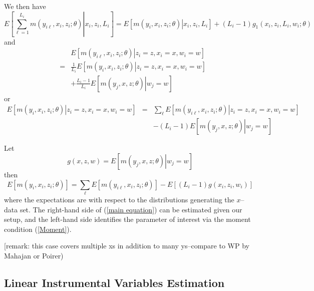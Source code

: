 \documentclass[12pt]{article}
\begin{document}
We then have%
\begin{equation*}
E\left[ \left. \sum_{\ell =1}^{L_{i}}m\left( y_{i\ell },x_{i},z_{i};\theta
\right) \right\vert x_{i},z_{i},L_{i}\right] =E\left[ \left. m\left(
y_{i},x_{i},z_{i};\theta \right) \right\vert x_{i},z_{i},L_{i}\right]
+\left( L_{i}-1\right) g_{1}\left( x_{i},z_{i},L_{i},w_{i};\theta \right)
\end{equation*}%
and%
\begin{eqnarray*}
&&E\left[ \left. m\left( y_{i\ell },x_{i},z_{i};\theta \right) \right\vert
z_{i}=z,x_{i}=x,w_{i}=w\right]  \\
&=&\frac{1}{L_{i}}E\left[ \left. m\left( y_{i},x_{i},z_{i};\theta \right)
\right\vert z_{i}=z,x_{i}=x,w_{i}=w\right]  \\
&&+\frac{L_{i}-1}{L_{i}}E\left[ \left. m\left( y_{j},x,z;\theta \right)
\right\vert w_{j}=w\right]
\end{eqnarray*}%
or%
\begin{eqnarray*}
E\left[ \left. m\left( y_{i},x_{i},z_{i};\theta \right) \right\vert
z_{i}=z,x_{i}=x,w_{i}=w\right]  &=&\sum_{\ell }E\left[ \left. m\left(
y_{i\ell },x_{i},z_{i};\theta \right) \right\vert z_{i}=z,x_{i}=x,w_{i}=w%
\right]  \\
&&-\left( L_{i}-1\right) E\left[ \left. m\left( y_{j},x,z;\theta \right)
\right\vert w_{j}=w\right]
\end{eqnarray*}

Let
\begin{equation*}
g\left( x,z,w\right) =E\left[ \left. m\left( y_{j},x,z;\theta \right)
\right\vert w_{j}=w\right]
\end{equation*}%
then
\begin{equation}
E\left[ m\left( y_{i},x_{i},z_{i};\theta \right) \right] =\sum_{\ell }E\left[
m\left( y_{i\ell },x_{i},z_{i};\theta \right) \right] -E\left[ \left(
L_{i}-1\right) g\left( x_{i},z_{i},w_{i}\right) \right]
\label{main equation}
\end{equation}%
where the expectations are with respect to the distributions generating the $%
x$--data set. The right-hand side of (\ref{main equation}) can be estimated
given our setup, and the left-hand side identifies the parameter of interest
via the moment condition (\ref{Moment}).

[remark: this case covers multiple xs in addition to many ys--compare to WP
by Mahajan or Poirer)

\subsection{Linear Instrumental Variables Estimation\label{Lin IV}}
\end{document}
